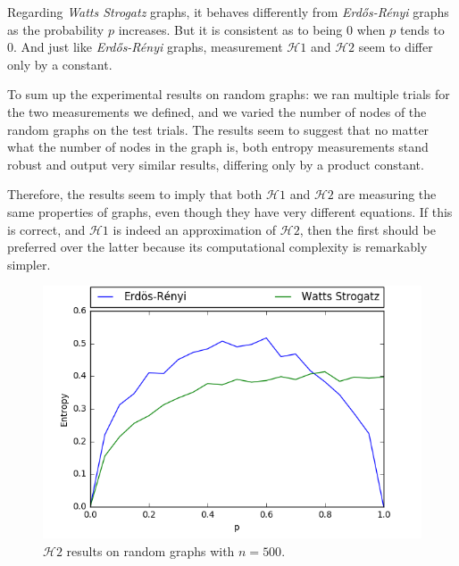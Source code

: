 \documentclass[journal]{IEEEtran}
\begin{document}
Regarding \textit{Watts Strogatz} graphs, it behaves differently from \textit{Erdős-Rényi} graphs as the probability $p$ increases. But it is consistent as to being 0 when $p$ tends to 0. And just like \textit{Erdős-Rényi} graphs, measurement $\mathcal{H}1$ and $\mathcal{H}2$ seem to differ only by a constant.

To sum up the experimental results on random graphs: we ran multiple trials for the two measurements we defined, and we varied the number of nodes of the random graphs on the test trials. The results seem to suggest that no matter what the number of nodes in the graph is, both entropy measurements stand robust and output very similar results, differing only by a product constant.

Therefore, the results seem to imply that both $\mathcal{H}1$ and $\mathcal{H}2$ are measuring the same properties of graphs, even though they have very different equations. If this is correct, and $\mathcal{H}1$ is indeed an approximation of $\mathcal{H}2$, then the first should be preferred over the latter because its computational complexity is remarkably simpler.

\begin{figure}[ht]
    \centering
    \includegraphics[width=\linewidth]{res/entropy2/experiment_n500.png}
    \caption{$\mathcal{H}2$ results on random graphs with $n = 500$.}
\end{figure}
\end{document}
